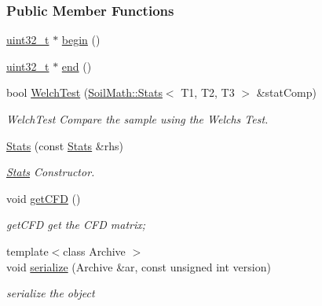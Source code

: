 \subsubsection*{Public Member Functions}
\begin{DoxyCompactItemize}
\item 
\hyperlink{_soil_math_types_8h_a435d1572bf3f880d55459d9805097f62}{uint32\+\_\+t} $\ast$ \hyperlink{class_soil_math_1_1_stats_ab4b0109ffb55f1d39acfad46bfd3bad5}{begin} ()
\item 
\hyperlink{_soil_math_types_8h_a435d1572bf3f880d55459d9805097f62}{uint32\+\_\+t} $\ast$ \hyperlink{class_soil_math_1_1_stats_a9d60ce82a2786e0422c3683c301f34ae}{end} ()
\item 
bool \hyperlink{class_soil_math_1_1_stats_a45f110fe8f440a4e45ef2b4e6cd9863c}{Welch\+Test} (\hyperlink{class_soil_math_1_1_stats}{Soil\+Math\+::\+Stats}$<$ T1, T2, T3 $>$ \&stat\+Comp)
\begin{DoxyCompactList}\small\item\em Welch\+Test Compare the sample using the Welch\textquotesingle{}s Test. \end{DoxyCompactList}\item 
\hyperlink{class_soil_math_1_1_stats_aa9727b7ea39b46f8a010a7b710b26d83}{Stats} (const \hyperlink{class_soil_math_1_1_stats}{Stats} \&rhs)
\begin{DoxyCompactList}\small\item\em \hyperlink{class_soil_math_1_1_stats}{Stats} Constructor. \end{DoxyCompactList}\item 
void \hyperlink{class_soil_math_1_1_stats_a5508190fbea17bfec505ff8c47b1a45e}{get\+C\+F\+D} ()
\begin{DoxyCompactList}\small\item\em get\+C\+F\+D get the C\+F\+D matrix; \end{DoxyCompactList}\item 
{\footnotesize template$<$class Archive $>$ }\\void \hyperlink{class_soil_math_1_1_stats_a708500880cf0fccd205fb59787f8899f}{serialize} (Archive \&ar, const unsigned int version)
\begin{DoxyCompactList}\small\item\em serialize the object \end{DoxyCompactList}\end{DoxyCompactItemize}

